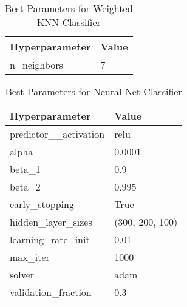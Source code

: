 \documentclass[a4paper, 12pt]{report}
\begin{document}
\begin{table}[H]
    \centering
    \caption{Best Parameters for Weighted KNN Classifier}
    \label{tab:best_parameters_weighted_knn_LC_Glass}
    \begin{tabular}{|l|l|}
    \hline
    \textbf{Hyperparameter} & \textbf{Value} \\ \hline
    n\_neighbors & 7 \\ \hline
    \end{tabular}
\end{table}

\begin{table}[H]
    \centering
    \caption{Best Parameters for Neural Net Classifier}
    \label{tab:best_parameters_neural_net_LC_Glass}
    \begin{tabular}{|l|l|}
    \hline
    \textbf{Hyperparameter} & \textbf{Value} \\ \hline
    predictor\_\_activation & relu \\ \hline
    alpha & 0.0001 \\ \hline
    beta\_1 & 0.9 \\ \hline
    beta\_2 & 0.995 \\ \hline
    early\_stopping & True \\ \hline
    hidden\_layer\_sizes & (300, 200, 100) \\ \hline
    learning\_rate\_init & 0.01 \\ \hline
    max\_iter & 1000 \\ \hline
    solver & adam \\ \hline
    validation\_fraction & 0.3 \\ \hline
    \end{tabular}
\end{table}
\end{document}
